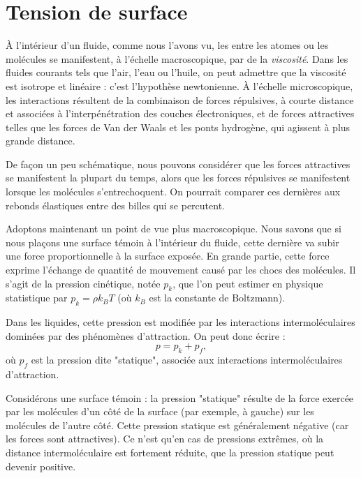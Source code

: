 \chapter{Tension de surface}

À l'intérieur d'un fluide, comme nous l'avons vu, les  entre les atomes ou les molécules se manifestent, à l'échelle macroscopique, par de la \emph{viscosité}. Dans les fluides courants tels que l'air, l'eau ou l'huile, on peut admettre que la viscosité est isotrope et linéaire : c'est l'hypothèse newtonienne. À l'échelle microscopique, les interactions résultent de la combinaison de forces répulsives, à courte distance et associées à l'interpénétration des couches électroniques, et de forces attractives telles que les forces de Van der Waals et les ponts hydrogène, qui agissent à plus grande distance.

De façon un peu schématique, nous pouvons considérer que les forces attractives se manifestent la plupart du temps, alors que les forces répulsives se manifestent lorsque les molécules s'entrechoquent. On pourrait comparer ces dernières aux rebonds élastiques entre des billes qui se percutent.

Adoptons maintenant un point de vue plus macroscopique. Nous savons que si nous plaçons une surface témoin à l'intérieur du fluide, cette dernière va subir une force proportionnelle à la surface exposée. En grande partie, cette force exprime l'échange de quantité de mouvement causé par les chocs des molécules. Il s'agit de la pression cinétique, notée $p_k$, que l'on peut estimer en physique statistique par $p_k = \rho k_B T$ (où $k_B$ est la constante de Boltzmann).

Dans les liquides, cette pression est modifiée par les interactions intermoléculaires dominées par des phénomènes d'attraction. On peut donc écrire \cite{berry71aa} :
\begin{equation}
  p = p_k + p_f,
  \label{eq:pression}
\end{equation}
où $p_f$ est la pression dite "statique", associée aux interactions intermoléculaires d'attraction.

Considérons une surface témoin : la pression "statique" résulte de la force exercée par les molécules d'un côté de la surface (par exemple, à gauche) sur les molécules de l'autre côté. Cette pression statique est généralement négative (car les forces sont attractives). Ce n’est qu’en cas de pressions extrêmes, où la distance intermoléculaire est fortement réduite, que la pression statique peut devenir positive.

